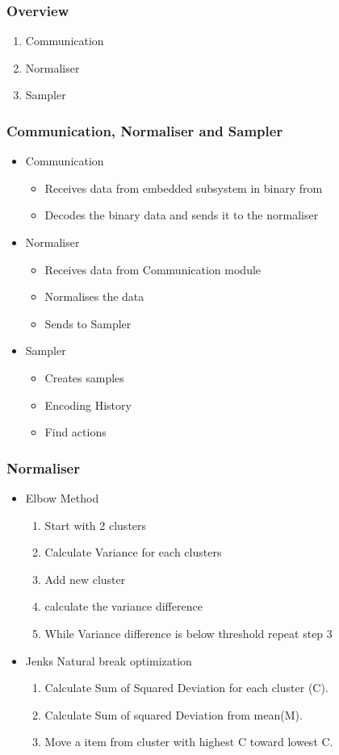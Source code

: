 \begin{frame}
        \frametitle{Overview}
        \begin{enumerate}
            \item Communication
            \item Normaliser
            \item Sampler
        \end{enumerate}
\end{frame}
\begin{frame}
	\frametitle{Communication, Normaliser and Sampler}
	\begin{itemize}
		\item Communication
\begin{itemize}
\item Receives data from embedded subsystem in binary from
\item Decodes the binary data and sends it to the normaliser
\end{itemize}
\item Normaliser
  \begin{itemize}
\item Receives data from Communication module
\item Normalises the data
\item Sends to Sampler
\end{itemize}

\item Sampler
  \begin{itemize}
   \item Creates samples
   \item Encoding History
   \item Find actions

   \end{itemize}

	\end{itemize}

\end{frame}
\begin{frame}
\frametitle{Normaliser}
\begin{itemize}
\item Elbow Method \begin{enumerate}
    \item Start with 2 clusters
    \item Calculate Variance for each clusters
    \item Add new cluster
    \item calculate the variance difference
    \item While Variance difference is below threshold repeat step 3
\end{enumerate}
\item Jenks Natural break optimization
\begin{enumerate}
\item Calculate Sum of Squared Deviation for each cluster (C).
\item Calculate Sum of squared Deviation from mean(M).
\item Move a item from cluster with highest C toward lowest C.
\end{enumerate}
\end{itemize}
\end{frame}
